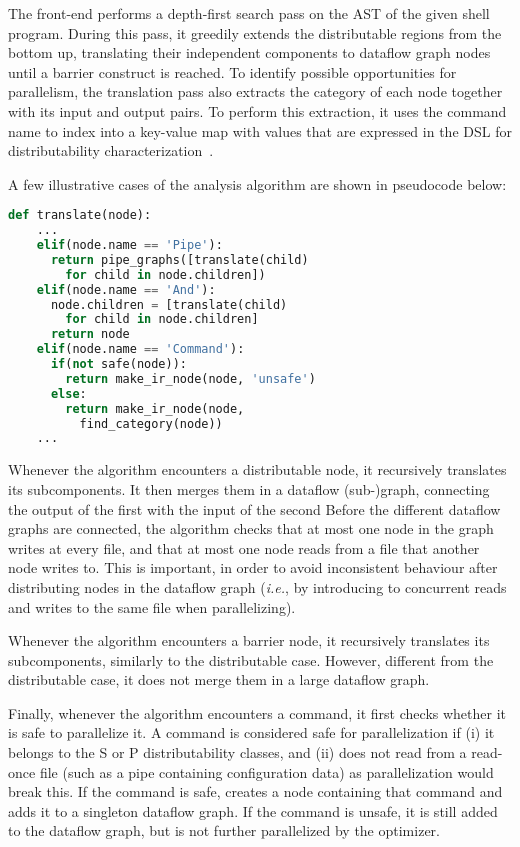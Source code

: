 \documentclass[letterpaper,twocolumn,10pt]{article}
\newcommand{\ie}{{\em i.e.}, }
\newcommand{\cn}[1]{\mbox{\textcircled{\footnotesize #1}}}
\newcommand{\pur}{\cn{\textsc{P}}\xspace}
\newcommand{\sta}{\cn{\textsc{S}}\xspace}
\begin{document}
The \sys front-end performs a depth-first search pass on the AST of
the given shell program.  During this pass, it greedily extends the
distributable regions from the bottom up, translating their
independent components to dataflow graph nodes until a barrier
construct is reached.  To identify possible opportunities for
parallelism, the translation pass also extracts the category of each
node together with its input and output pairs.  To perform this
extraction, it uses the command name to index into a key-value map
with values that are expressed in the DSL for distributability
characterization~.

A few illustrative cases of the analysis algorithm are shown in pseudocode below:

\begin{lstlisting}[language=python, float=h]
  def translate(node):
    ...
    elif(node.name == 'Pipe'):
      return pipe_graphs([translate(child)
        for child in node.children])
    elif(node.name == 'And'):
      node.children = [translate(child)
        for child in node.children]
      return node
    elif(node.name == 'Command'):
      if(not safe(node)):
        return make_ir_node(node, 'unsafe')
      else:
        return make_ir_node(node,
          find_category(node))
    ...
\end{lstlisting}

Whenever the algorithm encounters a distributable node, it recursively
translates its subcomponents.
It then merges them in a dataflow (sub-)graph, connecting the output of the first with the input of the second
Before the different dataflow graphs are connected, the
algorithm checks that at most one node in the graph writes at every
file, and that at most one node reads from a file that another node writes
to. This is important, in order to avoid inconsistent behaviour after
distributing nodes in the dataflow graph (\ie by introducing to
concurrent reads and writes to the same file when
parallelizing).

Whenever the algorithm encounters a barrier node,
it recursively translates its subcomponents, similarly to the distributable
case.
However, different from the distributable case, it does not merge them in a large dataflow graph.

Finally, whenever the algorithm encounters a command, it first
checks whether it is safe to parallelize it. A command is considered
safe for parallelization if (i) it belongs to the \sta or \pur distributability classes, and (ii) does not read from a read-once file (such as a pipe containing configuration data) as parallelization would break this. %
If the command is safe, \sys creates a node containing that command  and adds it to a singleton dataflow graph.
If the command is unsafe, it is still added to the dataflow graph, but is not further parallelized by the optimizer.
\end{document}
